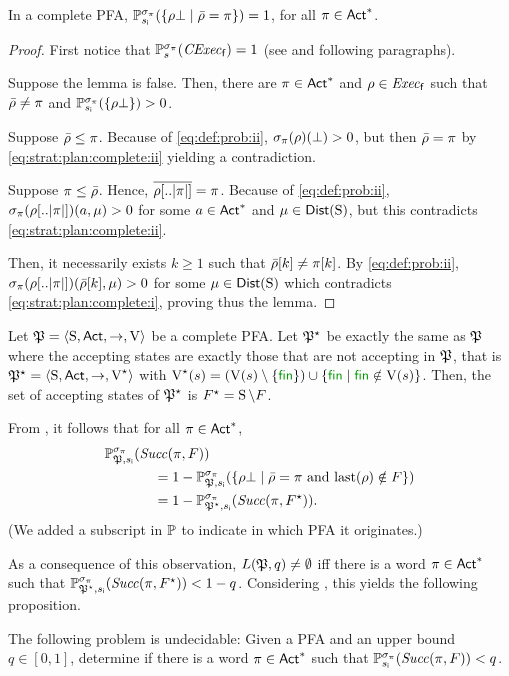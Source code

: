 \begin{lemma}\label{lm:strat:plan:complete}
  In a complete PFA,
  $\Prob_{\sini}^{\strat_\plan}(\{{\rho\complete}\mid{\bar{\rho}=\plan}\})=1$,
  for all $\plan\in\Act^*$.
\end{lemma}
%
\begin{proof}
  First notice that $\Prob^{\strat_\plan}_s(\cexecf)=1$ (see
   and following paragraphs).
  
  Suppose the lemma is false.  Then, there are $\plan\in\Act^*$ and
  $\rho\in\execf$ such that $\bar{\rho}\neq\plan$ and
  $\Prob_{\sini}^{\strat_\plan}(\{\rho\complete\})>0$.

  Suppose $\bar{\rho}\leq\plan$. Because of \cref{eq:def:prob:ii},
  $\strat_\plan(\rho)(\complete)> 0$, but then $\bar{\rho}=\plan$
  by \cref{eq:strat:plan:complete:ii} yielding a contradiction.

  Suppose $\plan\leq\bar{\rho}$. Hence,
  $\overline{\rho[..\size{\plan}]}=\plan$.  Because of
  \cref{eq:def:prob:ii}, $\strat_\plan(\rho[..\size{\plan}])(a,\mu)>0$
  for some $a\in\Act^*$ and $\mu\in\Dist(\S)$, but this contradicts
  \cref{eq:strat:plan:complete:ii}.

  Then, it necessarily exists $k\geq1$ such that
  $\bar{\rho}[k]\neq\plan[k]$.  By \cref{eq:def:prob:ii},
  $\strat_\plan(\rho[..\size{\plan}])(\bar{\rho}[k],\mu)>0$ for some
  $\mu\in\Dist(\S)$ which contradicts \cref{eq:strat:plan:complete:i},
  proving thus the lemma.
\end{proof}

Let $\pfa=\tup{\S,\Act,\ra,\V}$ be a complete PFA.  Let $\pfa^\star$
be exactly the same as $\pfa$ where the accepting states are exactly
those that are not accepting in $\pfa$, that is
$\pfa^\star=\tup{\S,\Act,\ra,\V^\star}$ with
$\V^\star(s)=(\V(s)\setminus\{\fin\})\cup\{\fin\mid{\fin\notin\V(s)}\}$.
%
Then, the set of accepting states of $\pfa^\star$ is
$F^\star=\S\setminus F$.

From , it follows that for all $\plan\in\Act^*$,
%
\begin{align*}
  \Prob_{\pfa,\sini}^{\strat_\plan}(\Succ(\plan,F)) \hspace{-4em} & \\
  &  =
  1 - \Prob_{\pfa,\sini}^{\strat_\plan}(\{{\rho\complete}\mid{\bar{\rho}=\plan \text{ and } \last(\rho)\notin F}\}) \\
  & =
  1 - \Prob_{\pfa^\star,\sini}^{\strat_\plan}(\Succ(\plan,F^\star)).
\end{align*}
%
(We added a subscript in $\Prob$ to indicate in which PFA it
originates.)

As a consequence of this observation, $L(\pfa,q)\neq\emptyset$ iff there
is a word $\plan\in\Act^*$ such that
$\Prob_{\pfa^\star,\sini}^{\strat_\plan}(\Succ(\plan,F^\star)) < 1-q$.
%
Considering , this yields the
following proposition.

\begin{proposition}
  The following problem is undecidable:
  Given a PFA and an upper bound $q\in[0,1]$, determine if there is a
  word $\plan\in\Act^*$ such that
  $\Prob_{\sini}^{\strat_\plan}(\Succ(\plan,F)) < q$.
\end{proposition}
